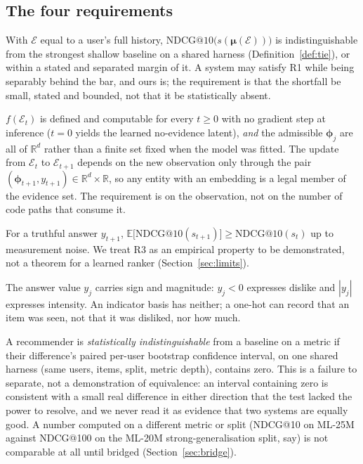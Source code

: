 \documentclass[acmsmall,review,anonymous]{acmart}
\newcommand{\R}{\mathbb{R}}
\newcommand{\bphi}{\boldsymbol{\phi}}
\newcommand{\bmu}{\boldsymbol{\mu}}
\begin{document}
\subsection{The four requirements}
\begin{description}[leftmargin=2.4em,itemsep=1.5pt]
  \item[R1.] With $\mathcal E$ equal to a user's full history, $\mathrm{NDCG}@10\bigl(s(\bmu(\mathcal E))\bigr)$ is indistinguishable from the strongest shallow baseline on a shared harness (Definition~\ref{def:tie}), or within a stated and separated margin of it. A system may satisfy R1 while being separably behind the bar, and ours is; the requirement is that the shortfall be small, stated and bounded, not that it be statistically absent.
  \item[R2.] $f(\mathcal E_t)$ is defined and computable for every $t\ge 0$ with no gradient step at inference ($t{=}0$ yields the learned no-evidence latent), \emph{and} the admissible $\bphi_j$ are all of $\R^{d}$ rather than a finite set fixed when the model was fitted. The update from $\mathcal E_t$ to $\mathcal E_{t+1}$ depends on the new observation only through the pair $(\bphi_{t+1},y_{t+1})\in\R^{d}\times\R$, so any entity with an embedding is a legal member of the evidence set. The requirement is on the observation, not on the number of code paths that consume it.
  \item[R3.] For a truthful answer $y_{t+1}$, $\mathbb E\bigl[\mathrm{NDCG}@10(s_{t+1})\bigr]\ge \mathrm{NDCG}@10(s_t)$ up to measurement noise. We treat R3 as an empirical property to be demonstrated, not a theorem for a learned ranker (Section~\ref{sec:limits}).
  \item[R4.] The answer value $y_j$ carries sign and magnitude: $y_j<0$ expresses dislike and $|y_j|$ expresses intensity. An indicator basis has neither; a one-hot can record that an item was seen, not that it was disliked, nor how much.
\end{description}

\begin{definition}\label{def:tie}
A recommender is \emph{statistically indistinguishable} from a baseline on a metric if their difference's paired per-user bootstrap confidence interval, on one shared harness (same users, items, split, metric depth), contains zero. This is a failure to separate, not a demonstration of equivalence: an interval containing zero is consistent with a small real difference in either direction that the test lacked the power to resolve, and we never read it as evidence that two systems are equally good. A number computed on a different metric or split (NDCG@10 on ML-25M against NDCG@100 on the ML-20M strong-generalisation split, say) is not comparable at all until bridged (Section~\ref{sec:bridge}).
\end{definition}
\end{document}
